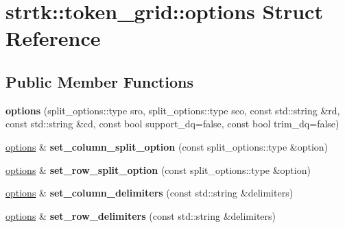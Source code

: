 \hypertarget{structstrtk_1_1token__grid_1_1options}{\section{strtk\-:\-:token\-\_\-grid\-:\-:options Struct Reference}
\label{structstrtk_1_1token__grid_1_1options}
}
\subsection*{Public Member Functions}
\begin{DoxyCompactItemize}
\item 
\hypertarget{structstrtk_1_1token__grid_1_1options_a44c176a8122b9a3e24846ea909488ff0}{{\bfseries options} (split\-\_\-options\-::type sro, split\-\_\-options\-::type sco, const std\-::string \&rd, const std\-::string \&cd, const bool support\-\_\-dq=false, const bool trim\-\_\-dq=false)}\label{structstrtk_1_1token__grid_1_1options_a44c176a8122b9a3e24846ea909488ff0}

\item 
\hypertarget{structstrtk_1_1token__grid_1_1options_a8f4e80af24af3a27c148f3b27ba459d7}{\hyperlink{structstrtk_1_1token__grid_1_1options}{options} \& {\bfseries set\-\_\-column\-\_\-split\-\_\-option} (const split\-\_\-options\-::type \&option)}\label{structstrtk_1_1token__grid_1_1options_a8f4e80af24af3a27c148f3b27ba459d7}

\item 
\hypertarget{structstrtk_1_1token__grid_1_1options_ab14faa5018e837b307adde7409684402}{\hyperlink{structstrtk_1_1token__grid_1_1options}{options} \& {\bfseries set\-\_\-row\-\_\-split\-\_\-option} (const split\-\_\-options\-::type \&option)}\label{structstrtk_1_1token__grid_1_1options_ab14faa5018e837b307adde7409684402}

\item 
\hypertarget{structstrtk_1_1token__grid_1_1options_a0626480209944c0a104bd8f000af35b3}{\hyperlink{structstrtk_1_1token__grid_1_1options}{options} \& {\bfseries set\-\_\-column\-\_\-delimiters} (const std\-::string \&delimiters)}\label{structstrtk_1_1token__grid_1_1options_a0626480209944c0a104bd8f000af35b3}

\item 
\hypertarget{structstrtk_1_1token__grid_1_1options_a01057a1f67833b3c2ec9b435e160107b}{\hyperlink{structstrtk_1_1token__grid_1_1options}{options} \& {\bfseries set\-\_\-row\-\_\-delimiters} (const std\-::string \&delimiters)}\label{structstrtk_1_1token__grid_1_1options_a01057a1f67833b3c2ec9b435e160107b}

\end{DoxyCompactItemize}
